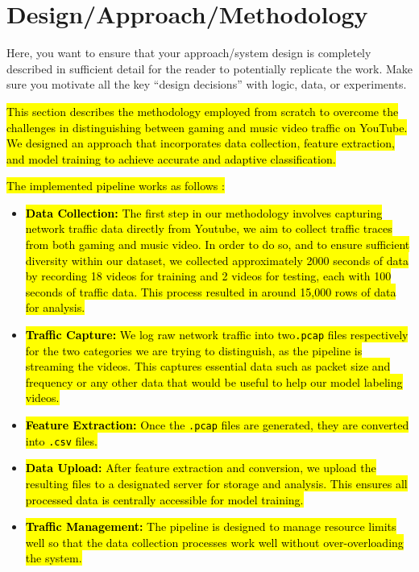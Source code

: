 \section{Design/Approach/Methodology} 
Here, you want to ensure that your approach/system design is completely described in sufficient detail for the reader to potentially replicate the work. Make sure you motivate all the key ``design decisions'' with logic, data, or experiments.


\label{sec:design}

\hl{This section describes the methodology employed from scratch to overcome the challenges in distinguishing between gaming and music video traffic on YouTube. We designed an approach that incorporates data collection, feature extraction, and model training to achieve accurate and adaptive classification.}

\vspace{2mm}


\hl{The implemented pipeline works as follows :}
\begin{itemize}
    \item \hl{\textbf{Data Collection:} The first step in our methodology involves capturing network traffic data directly from Youtube, we aim to collect traffic traces from both gaming and music video. In order to do so, and to ensure sufficient diversity within our dataset, we collected approximately 2000 seconds of data by recording 18 videos for training and 2 videos for testing, each with 100 seconds of traffic data. This process resulted in around 15,000 rows of data for analysis.}
    \item \hl{\textbf{Traffic Capture:} We log raw network traffic into two\texttt{.pcap} files respectively for the two categories we are trying to distinguish, as the pipeline is streaming the videos. This captures essential data such as packet size and frequency or any other data that would be useful to help our model labeling videos.}
    \item \hl{\textbf{Feature Extraction:} Once the \texttt{.pcap} files are generated, they are converted into \texttt{.csv} files.}
    \item \hl{\textbf{Data Upload:} After feature extraction and conversion, we upload the resulting files to a designated server for storage and analysis. This ensures all processed data is centrally accessible for model training.}
    \item \hl{\textbf{Traffic Management:} The pipeline is designed to manage resource limits well so that the data collection processes work well without over-overloading the system.}
\end{itemize}


